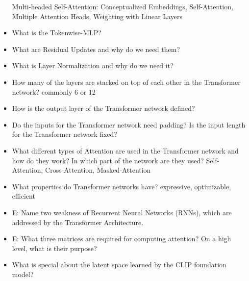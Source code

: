 \documentclass{report}
\begin{document}
\begin{itemize}
		\newline Multi-headed Self-Attention: Conceptualized Embeddings, Self-Attention, Multiple Attention Heads, Weighting with Linear Layers
		\item What is the Tokenwise-MLP?
		\newline 
		\item What are Residual Updates and why do we need them?
		\newline 
		\item What is Layer Normalization and why do we need it?
		\newline 
		\item How many of the layers are stacked on top of each other in the Transformer network?
		\newline commonly 6 or 12
		\item How is the output layer of the Transformer network defined?
		\newline 
		\item Do the inputs for the Transformer network need padding? Is the input length for the Transformer network fixed?
		\newline 
		\item What different types of Attention are used in the Transformer network and how do they work? In which part of the network are they used?
		\newline Self-Attention, Cross-Attention, Masked-Attention
		\item What properties do Transformer networks have?
		\newline expressive, optimizable, efficient
		\item E: Name two weakness of Recurrent Neural Networks (RNNs), which are addressed by the Transformer Architecture.
		\newline 
		\item E: What three matrices are required for computing attention? On a high level, what is their purpose?
		\newline 
		\item What is special about the latent space learned by the CLIP foundation model?
		\newline 
		

\end{itemize}
\end{document}
